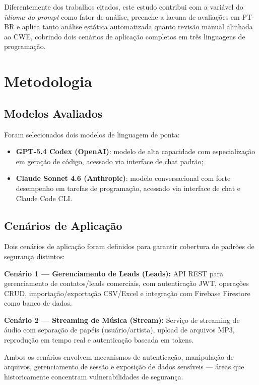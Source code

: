 \documentclass[12pt]{article}
\begin{document}
Diferentemente dos trabalhos citados, este estudo contribui com a variável do \textit{idioma do prompt} como fator de análise, preenche a lacuna de avaliações em PT-BR e aplica tanto análise estática automatizada quanto revisão manual alinhada ao CWE, cobrindo dois cenários de aplicação completos em três linguagens de programação.

\section{Metodologia}
\label{sec:metodologia}

\subsection{Modelos Avaliados}

Foram selecionados dois modelos de linguagem de ponta:
\begin{itemize}
  \item \textbf{GPT-5.4 Codex (OpenAI)}: modelo de alta capacidade com especialização em geração de código, acessado via interface de chat padrão;
  \item \textbf{Claude Sonnet 4.6 (Anthropic)}: modelo conversacional com forte desempenho em tarefas de programação, acessado via interface de chat e Claude Code CLI.
\end{itemize}

\subsection{Cenários de Aplicação}

Dois cenários de aplicação foram definidos para garantir cobertura de padrões de segurança distintos:

\textbf{Cenário 1 — Gerenciamento de Leads (Leads):} API REST para gerenciamento de contatos/leads comerciais, com autenticação JWT, operações CRUD, importação/exportação CSV/Excel e integração com Firebase Firestore como banco de dados.

\textbf{Cenário 2 — Streaming de Música (Stream):} Serviço de streaming de áudio com separação de papéis (usuário/artista), upload de arquivos MP3, reprodução em tempo real e autenticação baseada em tokens.

Ambos os cenários envolvem mecanismos de autenticação, manipulação de arquivos, gerenciamento de sessão e exposição de dados sensíveis — áreas que historicamente concentram vulnerabilidades de segurança.
\end{document}
